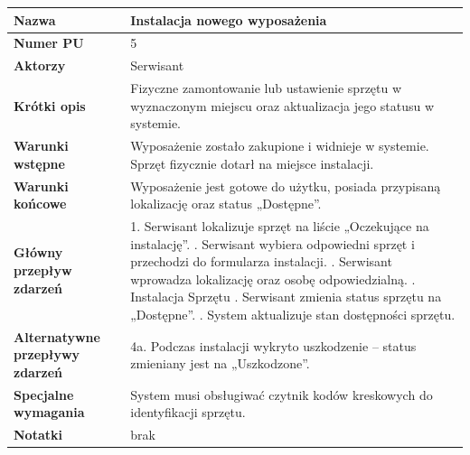 \documentclass{article}
\begin{document}
    \vspace{1cm} %

    \begin{tabular}{|m{10em}|m{30em}|}
        \hline
        \textbf{Nazwa} & Instalacja nowego wyposażenia \\
        \hline
        \textbf{Numer PU} & 5 \\
        \hline
        \textbf{Aktorzy} & Serwisant \\
        \hline
        \textbf{Krótki opis} & Fizyczne zamontowanie lub ustawienie sprzętu w wyznaczonym miejscu oraz aktualizacja jego statusu w systemie. \\
        \hline
        \textbf{Warunki wstępne} & Wyposażenie zostało zakupione i widnieje w systemie. Sprzęt fizycznie dotarł na miejsce instalacji. \\
        \hline
        \textbf{Warunki końcowe} & Wyposażenie jest gotowe do użytku, posiada przypisaną lokalizację oraz status „Dostępne”. \\
        \hline
        \textbf{Główny przepływ zdarzeń} & 
            1. Serwisant lokalizuje sprzęt na liście „Oczekujące na instalację”. \newline
            2. Serwisant wybiera odpowiedni sprzęt i przechodzi do formularza instalacji. \newline
            3. Serwisant wprowadza lokalizację oraz osobę odpowiedzialną. \newline
            4. Instalacja Sprzętu \newline
            5. Serwisant zmienia status sprzętu na „Dostępne”. \newline
            6. System aktualizuje stan dostępności sprzętu. \\
        \hline
        \textbf{Alternatywne przepływy zdarzeń} & 
            4a. Podczas instalacji wykryto uszkodzenie – status zmieniany jest na „Uszkodzone”. \\
        \hline
        \textbf{Specjalne wymagania} & System musi obsługiwać czytnik kodów kreskowych do identyfikacji sprzętu. \\
        \hline
        \textbf{Notatki} & brak \\
        \hline
    \end{tabular}

    \vspace{1cm}
\end{document}
